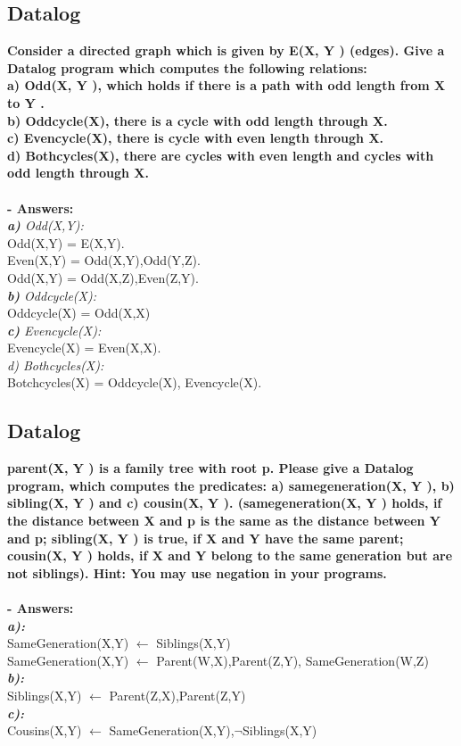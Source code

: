 \documentclass{article}
\begin{document}
\subsection{Datalog}
\textbf{Consider a directed graph which is given by E(X, Y ) (edges). Give a Datalog program which computes the following relations:\\
a) Odd(X, Y ), which holds if there is a path with odd length from X to Y .\\
b) Oddcycle(X), there is a cycle with odd length through X.\\
c) Evencycle(X), there is cycle with even length through X.\\
d) Bothcycles(X), there are cycles with even length and cycles with odd length through X.}\\\\
\textbf{- Answers:}\\
\textit{\textbf{a)} Odd(X,Y): }\\
   Odd(X,Y) = E(X,Y).\\
   Even(X,Y) = Odd(X,Y),Odd(Y,Z).\\
   Odd(X,Y) = Odd(X,Z),Even(Z,Y).\\
\textit{\textbf{b)} Oddcycle(X):  }\\
   Oddcycle(X) = Odd(X,X)\\
\textit{\textbf{c)} Evencycle(X): }\\
   Evencycle(X) = Even(X,X).\\
\textit{d) Bothcycles(X):}\\
Botchcycles(X) = Oddcycle(X), Evencycle(X).

\subsection{Datalog}
\textbf{parent(X, Y ) is a family tree with root p. Please give a Datalog program, which computes the predicates: a) samegeneration(X, Y ), b) sibling(X, Y ) and c) cousin(X, Y ). (samegeneration(X, Y ) holds, if the distance between X and p is the same as the distance between Y and p; sibling(X, Y ) is true, if X and Y have the same parent; cousin(X, Y ) holds, if X and Y belong to the same generation but are not siblings).
Hint: You may use negation in your programs.}\\\\
\textbf{- Answers:}\\
\textit{\textbf{a): }}\\
SameGeneration(X,Y) $\leftarrow$ Siblings(X,Y)\\
SameGeneration(X,Y) $\leftarrow$ Parent(W,X),Parent(Z,Y), SameGeneration(W,Z)\\
\textit{\textbf{b): }}\\
Siblings(X,Y) $\leftarrow$ Parent(Z,X),Parent(Z,Y)\\
\textit{\textbf{c): }}\\
Cousins(X,Y) $\leftarrow$ SameGeneration(X,Y),$\neg$Siblings(X,Y)
\end{document}
